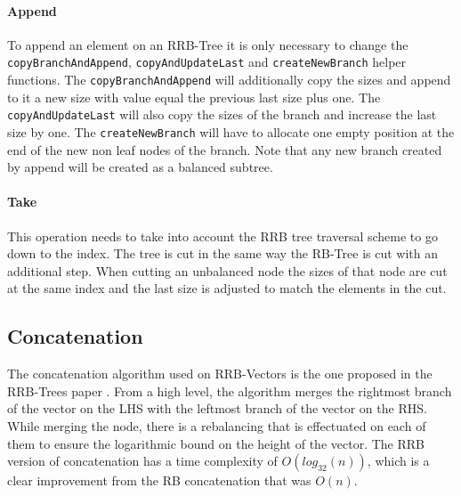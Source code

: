 \paragraph{Append}
To append an element on an RRB-Tree it is only necessary to change the \texttt{copyBranchAndAppend},  \texttt{copyAndUpdateLast} and \texttt{createNewBranch} helper functions. The \texttt{copyBranchAndAppend} will additionally copy the sizes and append to it a new size with value equal the previous last size plus one. The \texttt{copyAndUpdateLast} will also copy the sizes of the branch and increase the last size by one. The \texttt{createNewBranch} will have to allocate one empty position at the end of the new non leaf nodes of the branch. Note that any new branch created by append will be created as a balanced subtree.


\paragraph{Take}
This operation needs to take into account the RRB tree traversal scheme to go down to the index. The tree is cut in the same way the RB-Tree is cut with an additional step. When cutting an unbalanced node the sizes of that node are cut at the same index and the last size is adjusted to match the elements in the cut. 


\subsection{Concatenation}
The concatenation algorithm used on RRB-Vectors is the one proposed in the RRB-Trees paper \cite{RRBTrees}. From a high level, the algorithm merges the rightmost branch of the vector on the LHS with the leftmost branch of the vector on the RHS. While merging the node, there is a rebalancing that is effectuated on each of them to ensure the logarithmic bound on the height of the vector. The RRB version of concatenation has a time complexity of $O(log_{32}(n))$, which is a clear improvement from the RB concatenation that was $O(n)$.
 

